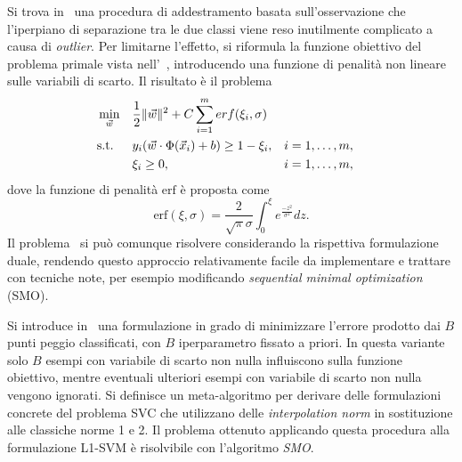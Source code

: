 Si trova in~\cite{2005_penalizing_outliers} una procedura di addestramento basata sull'osservazione che l'iperpiano di separazione tra le due classi viene reso inutilmente complicato a causa di \emph{outlier}. 
Per limitarne l'effetto, si riformula la funzione obiettivo del problema primale vista nell'~, introducendo una funzione di penalità non lineare sulle variabili di scarto. Il risultato è il problema
\begin{equation}\label{eq:adaptively_penalizing_outliers}
\begin{aligned}
& \min_{\Vec{w}}    && \frac{1}{2}\|\Vec{w}\|^2 +C \sum_{i=1}^{m}erf(\xi_i, \sigma) \\
& \textrm{s.t.}     && y_i(\Vec{w}\cdot\Phi(\Vec{x}_i) + b) \geq 1 -\xi_i, && i=1,\dots,m,\\
&                   && \xi_i \geq 0,  && i=1,\dots,m,
\end{aligned}
\end{equation}
dove la funzione di penalità $\mathrm{erf}$ è proposta come
\[
\mathrm{erf}(\xi, \sigma) = \frac{2}{\sqrt{\pi}\sigma} \int_{0}^{\xi}e^{\frac{-z^2}{\sigma^2}} dz.
\]
%
Il problema~ si può comunque risolvere considerando la rispettiva formulazione duale, rendendo questo approccio relativamente facile da implementare e trattare con tecniche note, per esempio modificando \emph{sequential minimal optimization} (SMO)\cite{SMO}.


Si introduce in~\cite{2006_svm_on_a_budget} una formulazione in grado di minimizzare l'errore prodotto dai $B$ punti peggio classificati, con $B$ iperparametro fissato a priori. 
In questa variante solo $B$ esempi con variabile di scarto non nulla influiscono sulla funzione obiettivo, mentre eventuali ulteriori esempi con variabile di scarto non nulla vengono ignorati.
Si definisce un meta-algoritmo per derivare delle formulazioni concrete del problema SVC che utilizzano delle \emph{interpolation norm}\cite{norm_interpolation} in sostituzione alle classiche norme 1 e 2. 
Il problema ottenuto applicando questa procedura alla formulazione L1-SVM è risolvibile con l'algoritmo \emph{SMO}\cite{SMO}.

